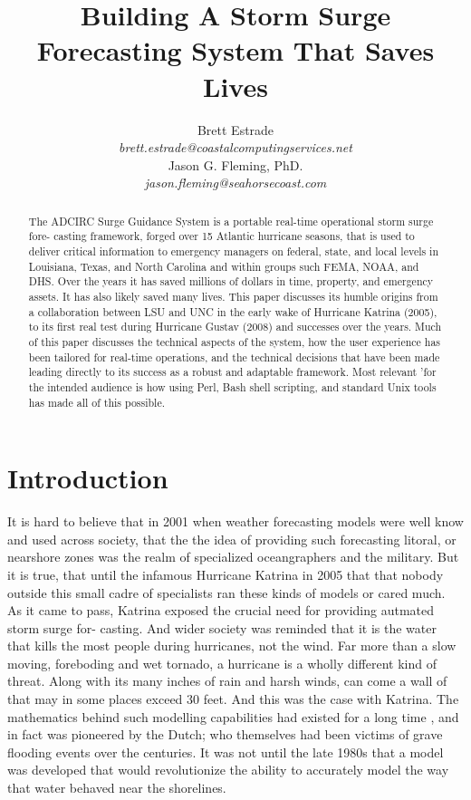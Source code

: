 \documentclass{article}
\title{Building A Storm Surge Forecasting System That Saves Lives}
\author{
Brett Estrade \\
\large\textit{brett.estrade@coastalcomputingservices.net}
\\
Jason G. Fleming, PhD. \\
\large\textit{jason.fleming@seahorsecoast.com}
}
\begin{document}
\maketitle

\begin{abstract}
The ADCIRC Surge Guidance System is a portable real-time operational storm surge
fore- casting framework, forged over 15 Atlantic hurricane seasons, that is used
to deliver critical information to emergency managers on federal, state, and
local levels in Louisiana, Texas, and North Carolina and within groups such
FEMA, NOAA, and DHS. Over the years it has saved millions of dollars in time,
property, and emergency assets. It has also likely saved many lives. This paper
discusses its humble origins from a collaboration between LSU and UNC in the
early wake of Hurricane Katrina (2005), to its first real test during Hurricane
Gustav (2008) and successes over the years. Much of this paper discusses the
technical aspects of the system, how the user experience has been tailored for
real-time operations, and the technical decisions that have been made leading
directly to its success as a robust and adaptable framework. Most relevant ’for
the intended audience is how using Perl, Bash shell scripting, and standard Unix
tools has made all of this possible.
\end{abstract}

\section{Introduction}

It is hard to believe that in 2001 when weather forecasting models were well
know and used across society, that the the idea of providing such forecasting
litoral, or nearshore zones was the realm of specialized oceangraphers and the
military. But it is true, that until the infamous Hurricane Katrina in 2005 that
that nobody outside this small cadre of specialists ran these kinds of models or
cared much.  As it came to pass, Katrina exposed the crucial need for providing
autmated storm surge for- casting. And wider society was reminded that it is the
water that kills the most people during hurricanes, not the wind. Far more than
a slow moving, foreboding and wet tornado, a hurricane is a wholly different
kind of threat. Along with its many inches of rain and harsh winds, can come a
wall of that may in some places exceed 30 feet. And this was the case with
Katrina.  The mathematics behind such modelling capabilities had existed for a
long time \cite{luettich1992adcirc}, and in fact was pioneered by the Dutch; who
themselves had been victims of grave flooding events over the centuries. It was
not until the late 1980s that a model was developed that would revolutionize the
ability to accurately model the way that water behaved near the shorelines.
\end{document}
